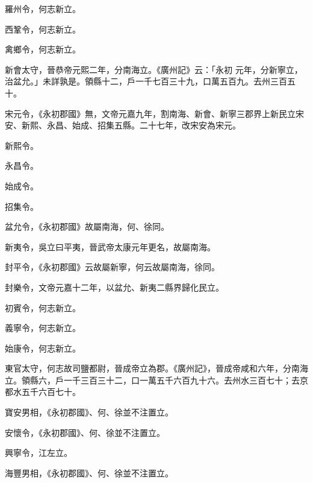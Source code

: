 \begin{pinyinscope}
 羅州令，何志新立。



 西鞏令，何志新立。



 禽鄉令，何志新立。



 新會太守，晉恭帝元熙二年，分南海立。《廣州記》云：「永初
 元年，分新寧立，治盆允。」未詳孰是。領縣十二，戶一千七百三十九，口萬五百九。去州三百五十。



 宋元令，《永初郡國》無，文帝元嘉九年，割南海、新會、新寧三郡界上新民立宋安、新熙、永昌、始成、招集五縣。二十七年，改宋安為宋元。



 新熙令。



 永昌令。



 始成令。



 招集令。



 盆允令，《永初郡國》故屬南海，何、徐同。



 新夷令，吳立曰平夷，晉武帝太康元年更名，故屬南海。



 封平令，《永初郡國》云故屬新寧，何云故屬南海，徐同。



 封樂令，文帝元嘉十二年，以盆允、新夷二縣界歸化民立。



 初賓令，何志新立。



 義寧令，何志新立。



 始康令，何志新立。



 東官太守，何志故司鹽都尉，晉成帝立為郡。《廣州記》，晉成帝咸和六年，分南海立。領縣六，戶一千三百三十二，口一萬五千六百九十六。去州水三百七十；去京都水五千六百七十。



 寶安男相，《永初郡國》、何、徐並不注置立。



 安懷令，《永初郡國》、何、徐並不注置立。



 興寧令，江左立。



 海豐男相，《永初郡國》、何、徐並不注置立。




\end{pinyinscope}

